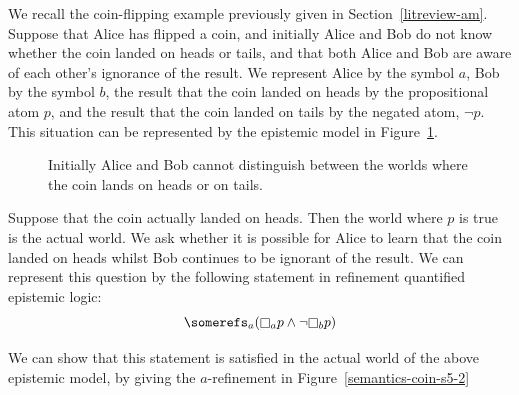 \begin{example}\label{semantics-coin-s5}
We recall the coin-flipping example previously given in
Section~\ref{litreview-am}.  Suppose that Alice has flipped a coin, and
initially Alice and Bob do not know whether the coin landed on heads or tails,
and that both Alice and Bob are aware of each other's ignorance of the result.
We represent Alice by the symbol $a$, Bob by the symbol $b$, the result that the
coin landed on heads by the propositional atom $p$, and the result that the coin
landed on tails by the negated atom, $\neg p$. This situation can be represented
by the epistemic model in Figure~\ref{semantics-coin-s5-1}.

\begin{figure}\label{semantics-coin-s5-1}
\begin{center} 
\caption{
Initially Alice and Bob cannot distinguish between the worlds where the coin
lands on heads or on tails.
}
\end{center}
\end{figure}

Suppose that the coin actually landed on heads. Then the world where $p$ is true
is the actual world. We ask whether it is possible for Alice to learn that the
coin landed on heads whilst Bob continues to be ignorant of the result. We can
represent this question by the following statement in refinement quantified
epistemic logic:
$$\somerefs_a (\knows_a p \land \neg \knows_b p)$$ 

We can show that this statement is satisfied in the actual world of the above
epistemic model, by giving the $a$-refinement in Figure~\ref{semantics-coin-s5-2}


\end{example}

